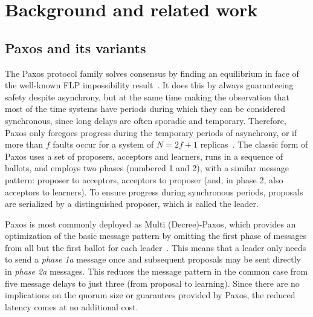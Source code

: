 \section{Background and related work}
\label{sec:related} 
\subsection{Paxos and its variants} \label{Paxos} 

The Paxos protocol family solves consensus by finding an equilibrium in face of the well-known FLP impossibility result~\cite{FLP85}. It does this by always guaranteeing safety despite asynchrony, but at the same time making the observation that most of the time systems have periods during which they can be considered synchronous, since long delays are often sporadic and temporary. Therefore, Paxos only foregoes progress during the temporary periods of asynchrony, or if more than $f$ faults occur for a system of $N=2f+1$ replicas~\cite{L01}. The classic form of Paxos uses a set of proposers, acceptors and learners, runs in a sequence of ballots, and employs two phases (numbered 1 and 2), with a similar message pattern: proposer to acceptors, acceptors to proposer (and, in phase 2, also acceptors to learners). To ensure progress during synchronous periods, proposals are serialized by a distinguished proposer, which is called the leader.\par
Paxos is most commonly deployed as Multi (Decree)-Paxos, which provides an optimization of the basic message pattern by omitting the first phase of messages from all but the first ballot for each leader~\cite{Renesse2011}. This means that a leader only needs to send a \textit{phase 1a} message once and subsequent proposals may be sent directly in \textit{phase 2a} messages. This reduces the message pattern in the common case from five message delays to just three (from proposal to learning). Since there are no implications on the quorum size or guarantees provided by Paxos, the reduced latency comes at no additional cost. \par

